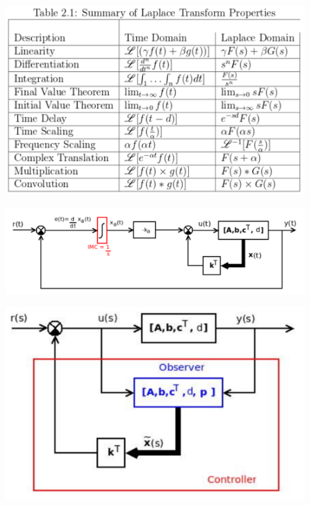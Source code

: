 \documentclass[a4paper, 10pt, titlepage]{article}
\begin{document}
\newpage
\begin{paracol}{2}[]
\medskip \medskip
\begin{figure}
\begin{center}
\includegraphics[scale=0.5]{laplace-properties.pdf}
\end{center}
\end{figure}

\begin{figure}
\begin{center}
\includegraphics[scale=0.3]{setpoint-statef.pdf}
\end{center}
\end{figure}

\begin{figure}
\begin{center}
\includegraphics[scale=0.4]{observer-statef.pdf}
\end{center}
\end{figure}

\end{paracol}
\end{document}

